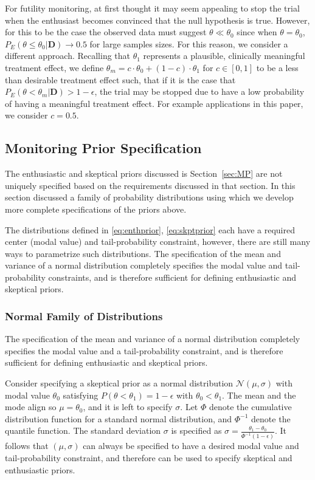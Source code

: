 \documentclass[12pt]{article}
\begin{document}
For futility monitoring, at first thought it may seem appealing to stop the trial when the enthusiast becomes convinced that the
null hypothesis is true. 
%
However, for this to be the case the observed data must suggest $\theta \ll \theta_0$ since when $\theta=\theta_0$,
$P_E(\theta\le\theta_0| \mathbf{D}) \rightarrow 0.5$ for large samples sizes.
%
For this reason, we consider a different approach.
%
Recalling that $\theta_1$ represents a plausible, clinically meaningful treatment effect, we define $\theta_{m}= c \cdot \theta_0 + (1-c) \cdot \theta_1$ for 
$c \in [0,1]$ to be a less than desirable treatment effect such, that if it is the case that $P_E\left(\theta<\theta_{m}\Big| \mathbf{D}\right)>1-\epsilon$, 
the trial may be stopped due to have a low probability of having a meaningful treatment effect.
%
For example applications in this paper, we consider $c=0.5$.

\subsection{Monitoring Prior Specification}

The enthusiastic and skeptical priors discussed is Section~\ref{sec:MP} are not uniquely specified based on the requirements discussed in that section. 
%
In this section discussed a family of probability distributions using which we develop more complete 
specifications of the priors above.


The distributions defined in \eqref{eq:enthprior}, \eqref{eq:skptprior} each have a required 
center (modal value) and tail-probability constraint, however, there are still many ways to parametrize such distributions. 
%
The specification of the mean and variance of a normal distribution completely specifies the modal value and tail-probability constraints, and is therefore sufficient for defining enthusiastic and skeptical priors.

\subsubsection{Normal Family of Distributions}
The specification of the mean and variance of a normal distribution completely specifies the modal value and a tail-probability constraint, and is therefore sufficient for defining enthusiastic and skeptical priors.

Consider specifying a skeptical prior as a normal distribution $\mathcal{N}(\mu,\sigma)$ with modal value $\theta_0$ satisfying $P(\theta<\theta_1)=1-\epsilon$ with $\theta_0<\theta_1$. The mean and the mode align so $\mu=\theta_0$, and it is left to specify $\sigma$. Let $\Phi$ denote the cumulative distribution function for a standard normal distribution, and $\Phi^{-1}$ denote the quantile function. The standard deviation $\sigma$ is specified as $\sigma=\frac{\theta_1-\theta_0}{\Phi^{-1}(1-\epsilon)}$. It follows that $(\mu,\sigma)$ can always be specified to have a desired modal value and tail-probability constraint, and therefore can be used to specify skeptical and enthusiastic priors.
\end{document}
